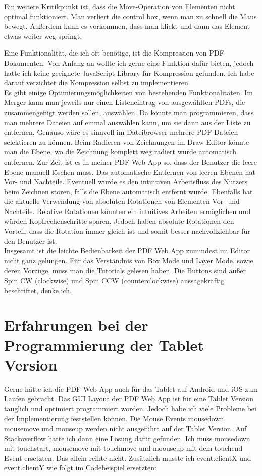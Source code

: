 Ein weitere Kritikpunkt ist, dass die Move-Operation von Elementen nicht optimal funktioniert. Man verliert die control box, wenn man zu schnell die Maus bewegt. Außerdem kann es vorkommen, dass man klickt und dann das Element etwas weiter weg springt.

Eine Funktionalität, die ich oft benötige, ist die Kompression von PDF-Dokumenten. Von Anfang an wollte ich gerne eine Funktion dafür bieten, jedoch hatte ich keine geeignete JavaScript Library für Kompression gefunden. Ich habe darauf verzichtet die Kompression selbst zu implementieren. \\
Es gibt einige Optimierungsmöglichkeiten von bestehenden Funktionalitäten. Im Merger kann man jeweils nur einen Listeneintrag von ausgewählten PDFs, die zusammengefügt werden sollen, auswählen. Da könnte man programmieren, dass man mehrere Dateien auf einmal auswählen kann, um sie dann aus der Liste zu entfernen. Genauso wäre es sinnvoll im Dateibrowser mehrere PDF-Dateien selektieren zu können. Beim Radieren von Zeichnungen im Draw Editor könnte man die Ebene, wo die Zeichnung komplett weg radiert wurde automatisch entfernen. Zur Zeit ist es in meiner PDF Web App so, dass der Benutzer die leere Ebene manuell löschen muss. Das automatische Entfernen von leeren Ebenen hat Vor- und Nachteile. Eventuell würde es den intuitiven Arbeitsfluss des Nutzers beim Zeichnen stören, falls die Ebene automatisch entfernt würde. Ebenfalls hat die aktuelle Verwendung von absoluten Rotationen von Elementen Vor- und Nachteile. Relative Rotationen könnten ein intuitives Arbeiten ermöglichen und würden Kopfrechenschritte sparen. Jedoch haben absolute Rotationen den Vorteil, dass die Rotation immer gleich ist und somit besser nachvollziehbar für den Benutzer ist. \\
Insgesamt ist die leichte Bedienbarkeit der PDF Web App zumindest im Editor nicht ganz gelungen. Für das Verständnis von Box Mode und Layer Mode, sowie deren Vorzüge, muss man die Tutorials gelesen haben. Die Buttons sind außer Spin CW (clockwise) und Spin CCW (counterclockwise) aussagekräftig beschriftet, denke ich. 

\section{Erfahrungen bei der Programmierung der Tablet Version}
Gerne hätte ich die PDF Web App auch für das Tablet auf Android und iOS zum Laufen gebracht. Das GUI Layout der PDF Web App ist für eine Tablet Version tauglich und optimiert programmiert worden. Jedoch habe ich viele Probleme bei der Implementierung feststellen können. Die Mouse Events mousedown, mousemove und mouseup werden nicht ausgeführt auf der Tablet Version. Auf Stackoverflow hatte ich dann eine Lösung dafür gefunden. Ich muss mousedown mit touchstart, mousemove mit touchmove und moouseup mit dem touchend Event ersetzten. Das allein reihte nicht. Zusätzlich musste ich event.clientX und event.clientY wie folgt im Codebeispiel ersetzten:

